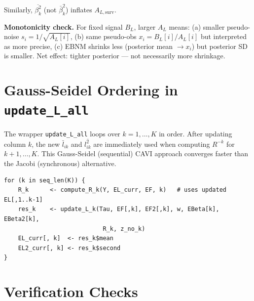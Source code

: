 \documentclass[11pt]{article}
\newcommand{\betabar}[1]{\bar{\beta}_{#1}}
\newcommand{\betasec}[1]{\overline{\beta^2_{#1}}}
\newcommand{\Rk}[0]{R^{-k}}
\begin{document}
Similarly, $\betasec{k}$ (not $\betabar{k}^2$) inflates $A_{L,\text{surv}}$.

\begin{verifybox}
\textbf{Monotonicity check.}  For fixed signal $B_L$, larger $A_L$ means:
(a) smaller pseudo-noise $s_i = 1/\sqrt{A_L[i]}$,
(b) same pseudo-obs $x_i = B_L[i]/A_L[i]$ but interpreted as more precise,
(c) EBNM shrinks less (posterior mean $\to x_i$) but posterior SD is smaller.
Net effect: tighter posterior — not necessarily more shrinkage.
\end{verifybox}

\section{Gauss-Seidel Ordering in \texttt{update\_L\_all}}\label{sec:gauss-seidel}

The wrapper \texttt{update\_L\_all} loops over $k = 1, \ldots, K$ in order.
After updating column $k$, the new $\bar{l}_{ik}$ and $\overline{l^2_{ik}}$
are immediately used when computing $\Rk$ for $k+1, \ldots, K$.  This
Gauss-Seidel (sequential) CAVI approach converges faster than the
Jacobi (synchronous) alternative.

\begin{codebox}
\begin{verbatim}
for (k in seq_len(K)) {
    R_k      <- compute_R_k(Y, EL_curr, EF, k)   # uses updated EL[,1..k-1]
    res_k    <- update_L_k(Tau, EF[,k], EF2[,k], w, EBeta[k], EBeta2[k],
                            R_k, z_no_k)
    EL_curr[, k]  <- res_k$mean
    EL2_curr[, k] <- res_k$second
}
\end{verbatim}
\end{codebox}

\section{Verification Checks}\label{sec:verification}
\end{document}
